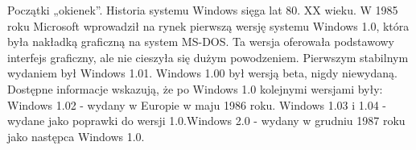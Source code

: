 \begin{frame}{Początki „okienek”.}
Historia systemu Windows sięga lat 80. XX wieku. W 1985 roku Microsoft wprowadził na rynek pierwszą wersję systemu Windows 1.0, która była nakładką graficzną na system MS-DOS. Ta wersja oferowała podstawowy interfejs graficzny, ale nie cieszyła się dużym powodzeniem. Pierwszym stabilnym wydaniem był Windows 1.01. Windows 1.00 był wersją beta, nigdy niewydaną. Dostępne informacje wskazują, że po Windows 1.0 kolejnymi wersjami były: Windows 1.02 - wydany w Europie w maju 1986 roku. Windows 1.03 i 1.04 - wydane jako poprawki do wersji 1.0.Windows 2.0 - wydany w grudniu 1987 roku jako następca Windows 1.0.

\end{frame}
